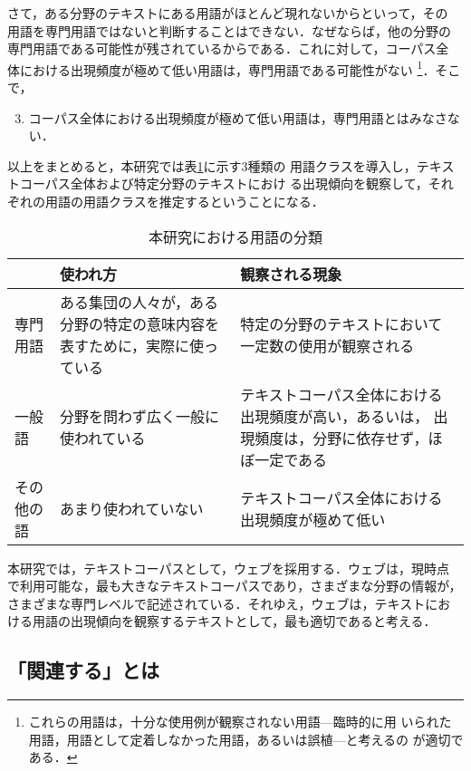 さて，ある分野のテキストにある用語がほとんど現れないからといって，その
用語を専門用語ではないと判断することはできない．なぜならば，他の分野の
専門用語である可能性が残されているからである．これに対して，コーパス全
体における出現頻度が極めて低い用語は，専門用語である可能性がない
\footnote{これらの用語は，十分な使用例が観察されない用語---臨時的に用
いられた用語，用語として定着しなかった用語，あるいは誤植---と考えるの
が適切である．}．そこで，
\begin{enumerate} \setcounter{enumi}{2}
 \item コーパス全体における出現頻度が極めて低い用語は，専門用語とはみなさない．
\end{enumerate}

以上をまとめると，本研究では\mbox{表\ref{tbl:term_class}}に示す3種類の
用語クラスを導入し，テキストコーパス全体および特定分野のテキストにおけ
る出現傾向を観察して，それぞれの用語の用語クラスを推定するということになる．

\begin{table}
 \begin{center}\small
  \caption{本研究における用語の分類}
  \label{tbl:term_class}
  \begin{tabular}{|l|p{}|p{}|}
   \hline
   & 使われ方 & 観察される現象 \\ \hline
専門用語 
& 
ある集団の人々が，ある分野の特定の意味内容を表すために，実際に使っている &
特定の分野のテキストにおいて一定数の使用が観察される
\\ \hline
一般語 & 分野を問わず広く一般に使われている & 
テキストコーパス全体における出現頻度が高い，あるいは，
出現頻度は，分野に依存せず，ほぼ一定である \\ \hline
その他の語
& 
あまり使われていない &
テキストコーパス全体における出現頻度が極めて低い \\ \hline
  \end{tabular}
 \end{center}
\end{table}

本研究では，テキストコーパスとして，ウェブを採用する．ウェブは，現時点
で利用可能な，最も大きなテキストコーパスであり，さまざまな分野の情報が，
さまざまな専門レベルで記述されている．それゆえ，ウェブは，テキストにお
ける用語の出現傾向を観察するテキストとして，最も適切であると考える．


\subsection{「関連する」とは}\label{sec:rel}

